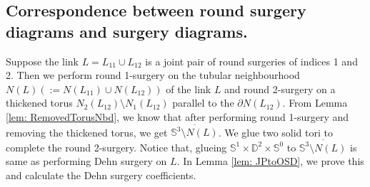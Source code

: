 \documentclass{amsart}
\theoremstyle{plain}
\theoremstyle{remark}
\theoremstyle{definition}
\newcommand{\s}{\mathbb{S}}
\newcommand{\D}{\mathbb{D}}
\newcommand{\dd}{\partial}
\begin{document}
\subsection{Correspondence between round surgery diagrams and surgery diagrams.}
Suppose the link $L=L_{11} \cup L_{12}$ is a joint pair of round surgeries of indices 1 and 2. 
Then we perform round 1-surgery on the tubular neighbourhood $N(L)(:= N(L_{11}) \cup N(L_{12}))$ of the link $L$ and round 2-surgery on a thickened torus $N_2(L_{12})\setminus N_1(L_{12})$ parallel to the $\dd N(L_{12})$. 
From Lemma \ref{lem: RemovedTorusNbd}, we know that after performing round 1-surgery and removing the thickened torus, we get $\overline{\s^3 \setminus N(L)}$. 
We glue two solid tori to complete the round 2-surgery. 
Notice that, glueing $\s^1 \times \D^2 \times \s^0$ to $\overline{\s^3\setminus N(L)}$ is same as performing Dehn surgery on $L$. 
In Lemma \ref{lem: JPtoOSD}, we prove this and calculate the Dehn surgery coefficients. 
\end{document}
